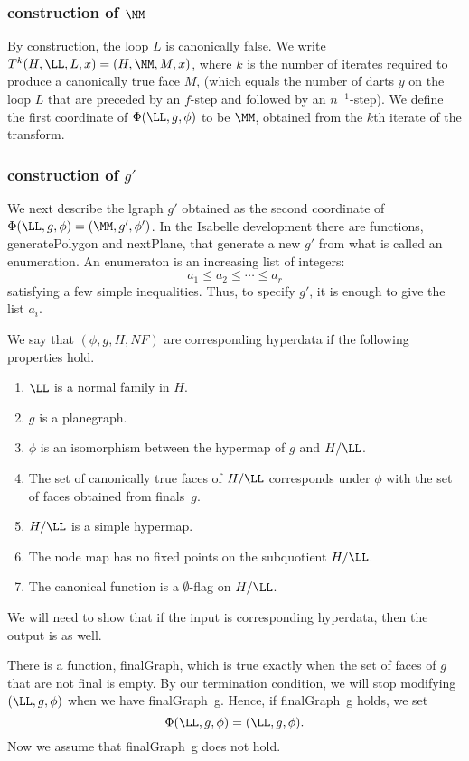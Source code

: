 \begin{lemma}
\begin{lemma}
\subsubsection{construction of $\MM$}

By construction, the loop $L$ is canonically false.
We write $T^k(H,\LL,L,x) = (H,\MM,M,x)$, where $k$ is
the number of iterates required to produce a canonically
true face $M$, (which equals the number of darts $y$ 
on the loop $L$
that are preceded by an $f$-step and followed by an $n^{-1}$-step).
We define the first coordinate of $\Phi(\LL,g,\phi)$ to be $\MM$,
obtained from the $k$th iterate of the transform.

\subsubsection{construction of $g'$}

We next describe the lgraph $g'$ obtained as the second
coordinate of $\Phi(\LL,g,\phi) = (\MM,g',\phi')$.  
In the Isabelle development there are functions, generatePolygon
and nextPlane, that generate a new $g'$ from what is called
an enumeration.  An enumeraton is an increasing list of integers:
\[
a_1\le a_2\le\cdots \le a_r
\]
satisfying a few simple inequalities.   
Thus, to specify $g'$, it is enough to give the list $a_i$.

We say that $(\phi,g,H,NF)$ are corresponding hyperdata if
the following properties hold.
\begin{enumerate}
\item $\LL$ is a normal family in $H$.
\item $g$ is a planegraph.
\item $\phi$ is an isomorphism between the hypermap of $g$  and
$H/\LL$.  
\item  The set of canonically true faces of $H/\LL$
corresponds under $\phi$ with the set of faces obtained from 
finals~$g$.  
\item  $H/\LL$ is a simple hypermap.
\item The node map has no fixed points on the subquotient $H/\LL$.
\item The canonical function is a $\emptyset$-flag on $H/\LL$.
\end{enumerate}

We will need to show that if the input is corresponding hyperdata, then
the output is as well.

There is a function, finalGraph, which is true exactly when
the set of faces of $g$ that are not final is empty.  By our
termination condition, we will stop modifying $(\LL,g,\phi)$
when we have finalGraph~g.  Hence, if finalGraph~g holds, we
set
\[
\Phi(\LL,g,\phi) = (\LL,g,\phi).
\]
Now we assume that finalGraph~g does not hold.


\end{lemma}
\end{lemma}

